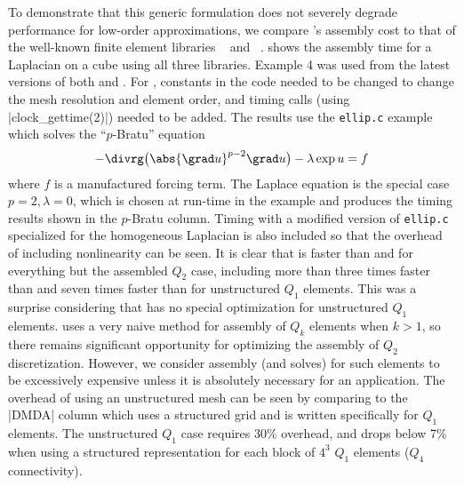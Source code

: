 To demonstrate that this generic formulation does not severely degrade performance for low-order approximations, we compare \Dohp's assembly cost to that of the well-known finite element libraries {\libmesh}~\cite{libmesh} and {\dealii}~\cite{bangerth2007deal}.
 shows the assembly time for a Laplacian on a cube using all three libraries.
Example 4 was used from the latest versions of both {\libmesh} and {\dealii}.
For \dealii, constants in the code needed to be changed to change the mesh resolution and element order, and timing calls (using \cverb|clock_gettime(2)|) needed to be added.
The {\Dohp} results use the \verb|ellip.c| example which solves the ``$p$-Bratu'' equation
\begin{align*}
  -\divrg \big(\abs{\grad u}^{p-2} \grad u \big) - \lambda \exp u = f
\end{align*}
where $f$ is a manufactured forcing term.
The Laplace equation is the special case $p=2, \lambda=0$, which is chosen at run-time in the example and produces the timing results shown in the $p$-Bratu column.
Timing with a modified version of \verb|ellip.c| specialized for the homogeneous Laplacian is also included so that the overhead of including nonlinearity can be seen.
It is clear that {\Dohp} is faster than {\libmesh} and {\dealii} for everything but the assembled $Q_2$ case, including more than three times faster than {\dealii} and seven times faster than {\libmesh} for unstructured $Q_1$ elements.
This was a surprise considering that {\Dohp} has no special optimization for unstructured $Q_1$ elements.
{\Dohp} uses a very naive method for assembly of $Q_k$ elements when $k>1$, so there remains significant opportunity for optimizing the assembly of $Q_2$ discretization.
However, we consider assembly (and solves) for such elements to be excessively expensive unless it is absolutely necessary for an application.
The overhead of using an unstructured mesh can be seen by comparing to the \cverb|DMDA| column which uses a structured grid and is written specifically for $Q_1$ elements.
The unstructured $Q_1$ case requires 30\% overhead, and drops below 7\% when using a structured representation for each block of $4^3$ $Q_1$ elements ($Q_4$ connectivity).

